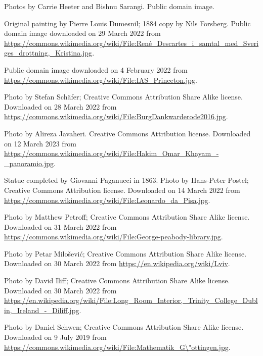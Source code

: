 \begin{Itemize} \raggedright

 Photos by Carrie Heeter and Bishnu Sarangi. Public domain image.

 Original painting by Pierre Louis Dumesnil; 1884 copy by Nils Forsberg. Public domain image downloaded on 29 March 2022 from\\[-2bp]
{\scriptsizer\url{https://commons.wikimedia.org/wiki/File:René\_Descartes\_i\_samtal\_med\_Sveriges\_drottning,\_Kristina.jpg}}.

 Public domain image downloaded on 4 February 2022 from \url{https://commons.wikimedia.org/wiki/File:IAS\_Princeton.jpg}.

 Photo by Stefan Schäfer; Creative Commons Attribution Share Alike license. Downloaded on 28 March 2022 from
\url{https://commons.wikimedia.org/wiki/File:BurgDankwarderode2016.jpg}.

 Photo by Alireza Javaheri. Creative Commons Attribution license. Downloaded on 12 March 2023 from\\
{\small\url{https://commons.wikimedia.org/wiki/File:Hakim\_Omar\_Khayam\_-\_panoramio.jpg}}.

 Statue completed by Giovanni Paganucci in 1863. Photo by Hans-Peter Postel; Creative Commons Attribution license. Downloaded on 14 March 2022 from\\
\url{https://commons.wikimedia.org/wiki/File:Leonardo\_da\_Pisa.jpg}.

 Photo by Matthew Petroff; Creative Commons Attribution Share Alike license. Downloaded on 31 March 2022 from
\url{https://commons.wikimedia.org/wiki/File:George-peabody-library.jpg}.


 Photo by Petar Milo\v{s}evi\'c; Creative Commons Attribution Share Alike license. Downloaded on 30 March 2022 from
\url{https://en.wikipedia.org/wiki/Lviv}.

 Photo by David Iliff; Creative Commons Attribution Share Alike license. Downloaded on 30 March 2022 from\\[-2bp]
{\scriptsizer\url{https://en.wikipedia.org/wiki/File:Long\_Room\_Interior,\_Trinity\_College\_Dublin,\_Ireland\_-\_Diliff.jpg}}.


 Photo by Daniel Schwen; Creative Commons Attribution Share Alike license. Downloaded on 9 July 2019 from \url{https://commons.wikimedia.org/wiki/File:Mathematik\_G\"ottingen.jpg}.

\end{Itemize}

